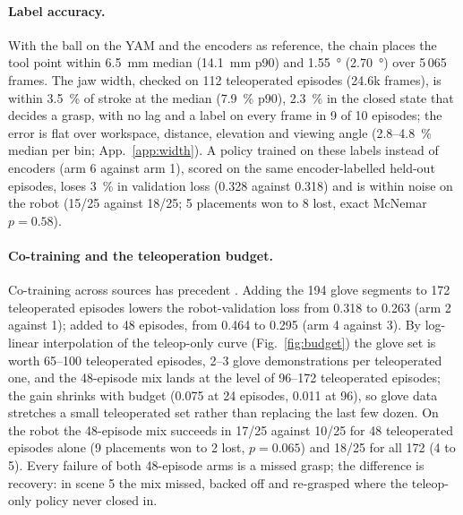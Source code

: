\paragraph{Label accuracy.}
With the ball on the YAM and the encoders as reference, the chain places the tool point within \SI{6.5}{mm} median (\SI{14.1}{mm} p90) and \SI{1.55}{\degree} (\SI{2.70}{\degree}) over 5\,065 frames. The jaw width, checked on 112 teleoperated episodes (24.6k frames), is within \SI{3.5}{\percent} of stroke at the median (\SI{7.9}{\percent} p90), \SI{2.3}{\percent} in the closed state that decides a grasp, with no lag and a label on every frame in 9 of 10 episodes; the error is flat over workspace, distance, elevation and viewing angle (\SI{2.8}{}--\SI{4.8}{\percent} median per bin; App.~\ref{app:width}). A policy trained on these labels instead of encoders (arm 6 against arm 1), scored on the same encoder-labelled held-out episodes, loses \SI{3}{\percent} in validation loss (0.328 against 0.318) and is within noise on the robot (15/25 against 18/25; 5 placements won to 8 lost, exact McNemar $p = 0.58$).

\paragraph{Co-training and the teleoperation budget.}
Co-training across sources has precedent \citep{fu2024mobilealoha,kareer2025egomimic}. Adding the 194 glove segments to 172 teleoperated episodes lowers the robot-validation loss from 0.318 to 0.263 (arm 2 against 1); added to 48 episodes, from 0.464 to 0.295 (arm 4 against 3). By log-linear interpolation of the teleop-only curve (Fig.~\ref{fig:budget}) the glove set is worth 65--100 teleoperated episodes, 2--3 glove demonstrations per teleoperated one, and the 48-episode mix lands at the level of 96--172 teleoperated episodes; the gain shrinks with budget (0.075 at 24 episodes, 0.011 at 96), so glove data stretches a small teleoperated set rather than replacing the last few dozen. On the robot the 48-episode mix succeeds in 17/25 against 10/25 for 48 teleoperated episodes alone (9 placements won to 2 lost, $p = 0.065$) and 18/25 for all 172 (4 to 5). Every failure of both 48-episode arms is a missed grasp; the difference is recovery: in scene 5 the mix missed, backed off and re-grasped where the teleop-only policy never closed in.

